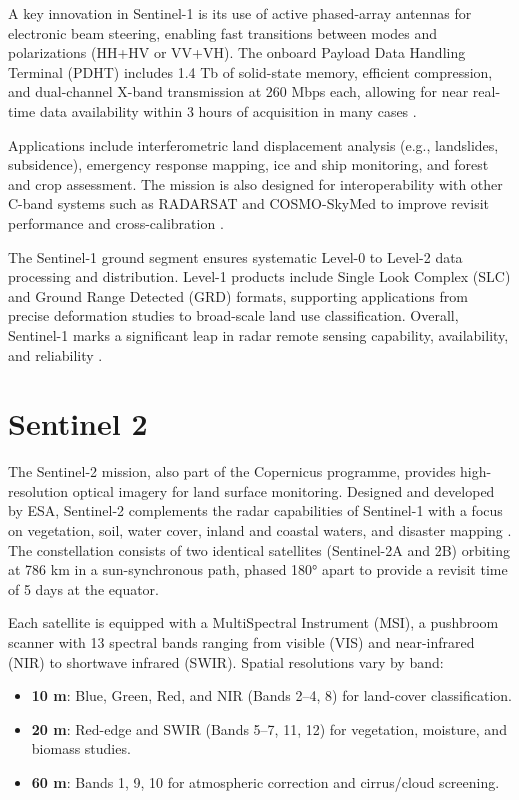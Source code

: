 A key innovation in Sentinel-1 is its use of active phased-array antennas for electronic beam steering, enabling fast transitions between modes and polarizations (HH+HV or VV+VH). The onboard Payload Data Handling Terminal (PDHT) includes 1.4 Tb of solid-state memory, efficient compression, and dual-channel X-band transmission at 260 Mbps each, allowing for near real-time data availability within 3 hours of acquisition in many cases \cite{TORRES20129}.

Applications include interferometric land displacement analysis (e.g., landslides, subsidence), emergency response mapping, ice and ship monitoring, and forest and crop assessment. The mission is also designed for interoperability with other C-band systems such as RADARSAT and COSMO-SkyMed to improve revisit performance and cross-calibration \cite{TORRES20129}.

The Sentinel-1 ground segment ensures systematic Level-0 to Level-2 data processing and distribution. Level-1 products include Single Look Complex (SLC) and Ground Range Detected (GRD) formats, supporting applications from precise deformation studies to broad-scale land use classification. Overall, Sentinel-1 marks a significant leap in radar remote sensing capability, availability, and reliability \cite{TORRES20129}.

\vspace{0.5cm}

\section{Sentinel 2}

The Sentinel-2 mission, also part of the Copernicus programme, provides high-resolution optical imagery for land surface monitoring. Designed and developed by ESA, Sentinel-2 complements the radar capabilities of Sentinel-1 with a focus on vegetation, soil, water cover, inland and coastal waters, and disaster mapping \cite{DRUSCH201225}. The constellation consists of two identical satellites (Sentinel-2A and 2B) orbiting at 786 km in a sun-synchronous path, phased 180° apart to provide a revisit time of 5 days at the equator.

Each satellite is equipped with a MultiSpectral Instrument (MSI), a pushbroom scanner with 13 spectral bands ranging from visible (VIS) and near-infrared (NIR) to shortwave infrared (SWIR). Spatial resolutions vary by band:
\begin{itemize}
    \item \textbf{10 m}: Blue, Green, Red, and NIR (Bands 2–4, 8) for land-cover classification.
    \item \textbf{20 m}: Red-edge and SWIR (Bands 5–7, 11, 12) for vegetation, moisture, and biomass studies.
    \item \textbf{60 m}: Bands 1, 9, 10 for atmospheric correction and cirrus/cloud screening.
\end{itemize}

